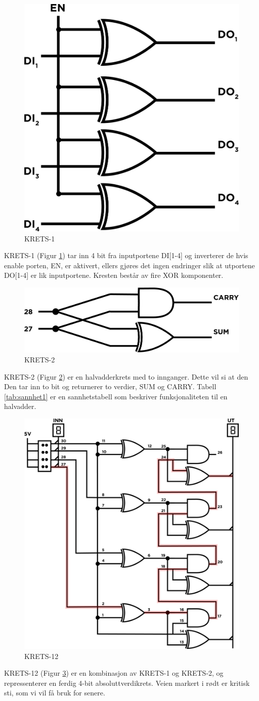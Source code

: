 \documentclass{article}
\begin{document}
\begin{figure}[H]
	\centering
	\includegraphics[width=0.2\linewidth]{krets1}
	\caption{KRETS-1}
	\label{fig:KRETS-1}
\end{figure}

KRETS-1 (Figur \ref{fig:KRETS-1}) tar inn 4 bit fra inputportene DI[1-4] og inverterer de hvis enable porten, EN, er aktivert, ellers gjøres det ingen endringer slik at utportene DO[1-4] er lik inputportene. Kresten består av fire XOR komponenter.

\begin{figure}[H]
	\centering
	\includegraphics[width=0.4\linewidth]{krets2}
	\caption{KRETS-2}
	\label{fig:KRETS-2}
\end{figure}

KRETS-2 (Figur \ref{fig:KRETS-2}) er en halvadderkrets med to innganger. Dette vil si at den Den tar inn to bit og returnerer to verdier, SUM og CARRY. Tabell \ref{tab:sannhet1} er en sannhetstabell som beskriver funksjonaliteten til en halvadder.

\begin{figure}[H]
	\centering
	\includegraphics[width=0.5\linewidth]{krets12}
	\caption{KRETS-12}
	\label{fig:KRETS-12}
\end{figure}

KRETS-12 (Figur \ref{fig:KRETS-12}) er en kombinasjon av KRETS-1 og KRETS-2, og repressenterer en ferdig 4-bit absoluttverdikrets. Veien markert i rødt er kritisk sti, som vi vil få bruk for senere.
\end{document}
